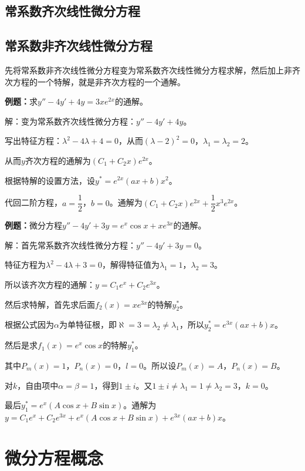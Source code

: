 \documentclass[UTF8, 12pt]{ctexart}
\begin{document}
\subsection{常系数齐次线性微分方程}



\subsection{常系数非齐次线性微分方程}

先将常系数非齐次线性微分方程变为常系数齐次线性微分方程求解，然后加上非齐次方程的一个特解，就是非齐次方程的一个通解。

\textbf{例题：}求$y''-4y'+4y=3xe^{2x}$的通解。

解：变为常系数齐次线性微分方程：$y''-4y'+4y$。

写出特征方程：$\lambda^2-4\lambda+4=0$，从而$(\lambda-2)^2=0$，$\lambda_1=\lambda_2=2$。

从而$y$齐次方程的通解为$(C_1+C_2x)e^{2x}$。

根据特解的设置方法，设$y^*=e^{2x}(ax+b)x^2$。

代回二阶方程，$a=\dfrac{1}{2}$，$b=0$。通解为$(C_1+C_2x)e^{2x}+\dfrac{1}{2}x^3e^{2x}$。

\textbf{例题：}微分方程$y''-4y'+3y=e^x\cos x+xe^{3x}$的通解。

解：首先常系数齐次线性微分方程：$y''-4y'+3y=0$。

特征方程为$\lambda^2-4\lambda+3=0$，解得特征值为$\lambda_1=1$，$\lambda_2=3$。

所以该齐次方程的通解：$y=C_1e^x+C_2e^{3x}$。

然后求特解，首先求后面$f_2(x)=xe^{3x}$的特解$y_2^*$。

根据公式因为$\alpha$为单特征根，即$\aleph=3=\lambda_2\neq\lambda_1$，所以$y_2^*=e^{3x}(ax+b)x$。

然后是求$f_1(x)=e^x\cos x$的特解$y_1^*$。

其中$P_m(x)=1$，$P_n(x)=0$，$l=0$。所以设$P_m(x)=A$，$P_n(x)=B$。

对$k$，自由项中$\alpha=\beta=1$，得到$1\pm i$。又$1\pm i\neq\lambda_1=1\neq\lambda_2=3$，$k=0$。

最后$y_1^*=e^x(A\cos x+B\sin x)$。通解为$y=C_1e^x+C_2e^{3x}+e^x(A\cos x+B\sin x)+e^{3x}(ax+b)x$。

\section{微分方程概念}
\end{document}
